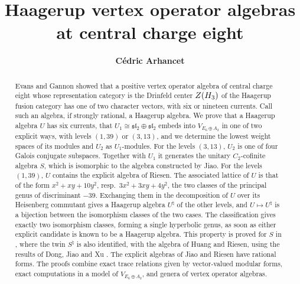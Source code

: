 \documentclass[leqno]{article}
\let\cal\relax
\newcommand{\cal}{\mathcal}
\numberwithin{equation}{section}
\begin{document}
\title{\bfseries{Haagerup vertex operator algebras at central charge eight}}
\date{}
\author{\bfseries{C\'edric Arhancet}}
\maketitle

\begin{abstract}
Evans and Gannon showed that a positive vertex operator algebra of central charge eight whose representation category is the Drinfeld center $Z(\cal H_3)$ of the Haagerup fusion category has one of two character vectors, with six or nineteen currents. Call such an algebra, if strongly rational, a Haagerup algebra. We prove that a Haagerup algebra $U$ has six currents, that $U_1 \cong \mathfrak{sl}_2 \oplus \mathfrak{sl}_2$ embeds into $V_{E_6 \oplus A_2}$ in one of two explicit ways, with levels $(1,39)$ or $(3,13)$, and we determine the lowest weight spaces of its modules and $U_2$ as $U_1$-modules. For the levels $(3,13)$, $U_2$ is one of four Galois conjugate subspaces. Together with $U_1$ it generates the unitary $C_2$-cofinite algebra $S$, which is isomorphic to the algebra constructed by Jiao. For the levels $(1,39)$, $U$ contains the explicit algebra of Riesen. The associated lattice of $U$ is that of the form $x^2+xy+10y^2$, resp.\ $3x^2+3xy+4y^2$, the two classes of the principal genus of discriminant $-39$. Exchanging them in the decomposition of $U$ over its Heisenberg commutant gives a Haagerup algebra $U^\natural$ of the other levels, and $U \mapsto U^\natural$ is a bijection between the isomorphism classes of the two cases. The classification gives exactly two isomorphism classes, forming a single hyperbolic genus, as soon as either explicit candidate is known to be a Haagerup algebra. This property is proved for $S$ in \cite{ArhIII}, where the twin $S^\natural$ is also identified, with the algebra of Huang and Riesen, using the results of Dong, Jiao and Xu \cite{DJX26}. The explicit algebras of Jiao and Riesen have rational forms. The proofs combine exact trace relations given by vector-valued modular forms, exact computations in a model of $V_{E_6 \oplus A_2}$, and genera of vertex operator algebras.
\end{abstract}

\makeatletter
 \renewcommand{\@makefntext}[1]{#1}
 \makeatother
\end{document}
